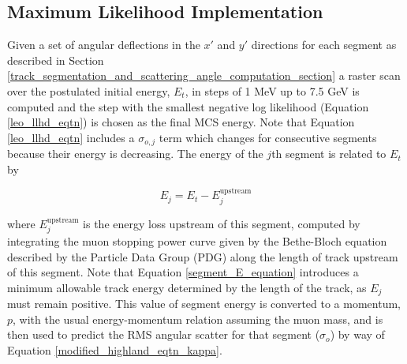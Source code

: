 \documentclass[a4paper,11pt]{article}
\begin{document}
\subsection{Maximum Likelihood Implementation}\label{maximum_likelihood_section}

Given a set of angular deflections in the $x'$ and $y'$ directions for each segment as described in Section \ref{track_segmentation_and_scattering_angle_computation_section} a raster scan over the postulated initial energy, $E_t$, in steps of 1 MeV up to 7.5 GeV is computed and the step with the smallest negative log likelihood (Equation \ref{leo_llhd_eqtn}) is chosen as the final MCS energy. Note that Equation \ref{leo_llhd_eqtn} includes a $\sigma_{o,j}$ term which changes for consecutive segments because their energy is decreasing. The energy of the $j$th segment is related to $E_t$ by

\begin{equation}\label{segment_E_equation}
E_{j} = E_t - E^{\text{upstream}}_{j}
\end{equation}

where $E^{\text{upstream}}_{j}$ is the energy loss upstream of this segment, computed by integrating the muon stopping power curve given by the Bethe-Bloch equation described by the Particle Data Group (PDG) \cite{stoppingpowersource} along the length of track upstream of this segment. Note that Equation \ref{segment_E_equation} introduces a minimum allowable track energy determined by the length of the track, as $E_{j}$ must remain positive. This value of segment energy is converted to a momentum, $p$, with the usual energy-momentum relation assuming the muon mass, and is then used to predict the RMS angular scatter for that segment ($\sigma_o$) by way of Equation \ref{modified_highland_eqtn_kappa}. 
\end{document}
